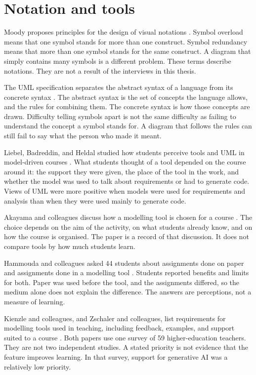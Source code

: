 \section{Notation and tools}
\label{sec:rw_tools_mde}

Moody proposes principles for the design of visual notations \cite{moody2009physics}. Symbol overload means that one symbol stands for more than one construct. Symbol redundancy means that more than one symbol stands for the same construct. A diagram that simply contains many symbols is a different problem. These terms describe notations. They are not a result of the interviews in this thesis.

The UML specification separates the abstract syntax of a language from its concrete syntax \cite{omg2017uml}. The abstract syntax is the set of concepts the language allows, and the rules for combining them. The concrete syntax is how those concepts are drawn. Difficulty telling symbols apart is not the same difficulty as failing to understand the concept a symbol stands for. A diagram that follows the rules can still fail to say what the person who made it meant.

Liebel, Badreddin, and Heldal studied how students perceive tools and UML in model-driven courses \cite{liebel2017model}. What students thought of a tool depended on the course around it: the support they were given, the place of the tool in the work, and whether the model was used to talk about requirements or had to generate code. Views of UML were more positive when models were used for requirements and analysis than when they were used mainly to generate code.

Akayama and colleagues discuss how a modelling tool is chosen for a course \cite{akayama2013tools}. The choice depends on the aim of the activity, on what students already know, and on how the course is organised. The paper is a record of that discussion. It does not compare tools by how much students learn.

Hammouda and colleagues asked 44 students about assignments done on paper and assignments done in a modelling tool \cite{hammouda2014tools}. Students reported benefits and limits for both. Paper was used before the tool, and the assignments differed, so the medium alone does not explain the difference. The answers are perceptions, not a measure of learning.

Kienzle and colleagues, and Zschaler and colleagues, list requirements for modelling tools used in teaching, including feedback, examples, and support suited to a course \cite{kienzle2024requirements,zschaler2025tools}. Both papers use one survey of 59 higher-education teachers. They are not two independent studies. A stated priority is not evidence that the feature improves learning. In that survey, support for generative AI was a relatively low priority.

